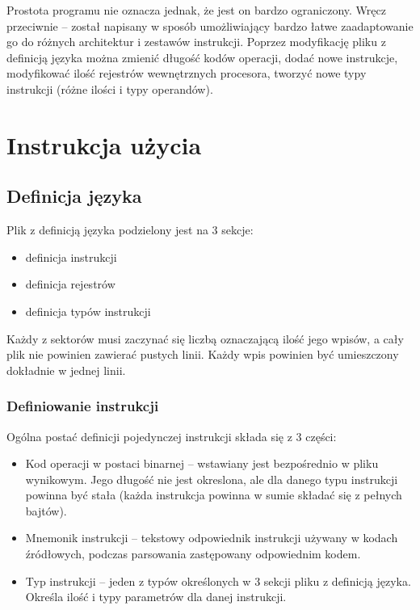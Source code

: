 \documentclass[a4paper,12pt]{report}
\begin{document}
Prostota programu nie oznacza jednak, że jest on bardzo ograniczony. Wręcz przeciwnie -- został napisany w sposób umożliwiający bardzo łatwe zaadaptowanie go do różnych architektur i zestawów instrukcji. Poprzez modyfikację pliku z definicją języka można zmienić długość kodów operacji, dodać nowe instrukcje, modyfikować ilość rejestrów wewnętrznych procesora, tworzyć nowe typy instrukcji (różne ilości i typy operandów).

\section{Instrukcja użycia}

\subsection{Definicja języka}

Plik z definicją języka podzielony jest na 3 sekcje:
\begin{itemize}
  \item definicja instrukcji
  \item definicja rejestrów
  \item definicja typów instrukcji
\end{itemize}

Każdy z sektorów musi zaczynać się liczbą oznaczającą ilość jego wpisów, a cały plik nie powinien zawierać pustych linii. Każdy wpis powinien być umieszczony dokładnie w jednej linii.

\subsubsection{Definiowanie instrukcji}
Ogólna postać definicji pojedynczej instrukcji składa się z 3 części:
\begin{itemize}
  \item Kod operacji w postaci binarnej -- wstawiany jest bezpośrednio w pliku wynikowym. Jego długość nie jest okreslona, ale dla danego typu instrukcji powinna być stała (każda instrukcja powinna w sumie składać się z pełnych bajtów).
  \item Mnemonik instrukcji -- tekstowy odpowiednik instrukcji używany w kodach źródłowych, podczas parsowania zastępowany odpowiednim kodem.
  \item Typ instrukcji -- jeden z typów określonych w 3 sekcji pliku z definicją języka. Określa ilość i typy parametrów dla danej instrukcji.
\end{itemize}
\end{document}
